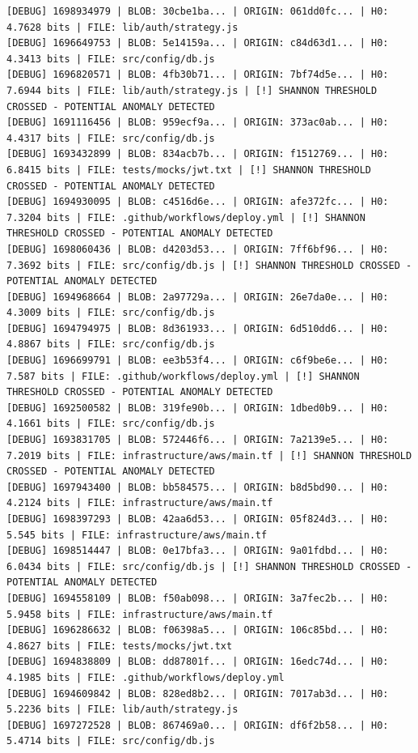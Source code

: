\documentclass[12pt, a4paper, oneside]{report}
\begin{document}
\newpage
\begin{lstlisting}[basicstyle=\tiny\ttfamily]
[DEBUG] 1698934979 | BLOB: 30cbe1ba... | ORIGIN: 061dd0fc... | H0: 4.7628 bits | FILE: lib/auth/strategy.js
[DEBUG] 1696649753 | BLOB: 5e14159a... | ORIGIN: c84d63d1... | H0: 4.3413 bits | FILE: src/config/db.js
[DEBUG] 1696820571 | BLOB: 4fb30b71... | ORIGIN: 7bf74d5e... | H0: 7.6944 bits | FILE: lib/auth/strategy.js | [!] SHANNON THRESHOLD CROSSED - POTENTIAL ANOMALY DETECTED
[DEBUG] 1691116456 | BLOB: 959ecf9a... | ORIGIN: 373ac0ab... | H0: 4.4317 bits | FILE: src/config/db.js
[DEBUG] 1693432899 | BLOB: 834acb7b... | ORIGIN: f1512769... | H0: 6.8415 bits | FILE: tests/mocks/jwt.txt | [!] SHANNON THRESHOLD CROSSED - POTENTIAL ANOMALY DETECTED
[DEBUG] 1694930095 | BLOB: c4516d6e... | ORIGIN: afe372fc... | H0: 7.3204 bits | FILE: .github/workflows/deploy.yml | [!] SHANNON THRESHOLD CROSSED - POTENTIAL ANOMALY DETECTED
[DEBUG] 1698060436 | BLOB: d4203d53... | ORIGIN: 7ff6bf96... | H0: 7.3692 bits | FILE: src/config/db.js | [!] SHANNON THRESHOLD CROSSED - POTENTIAL ANOMALY DETECTED
[DEBUG] 1694968664 | BLOB: 2a97729a... | ORIGIN: 26e7da0e... | H0: 4.3009 bits | FILE: src/config/db.js
[DEBUG] 1694794975 | BLOB: 8d361933... | ORIGIN: 6d510dd6... | H0: 4.8867 bits | FILE: src/config/db.js
[DEBUG] 1696699791 | BLOB: ee3b53f4... | ORIGIN: c6f9be6e... | H0: 7.587 bits | FILE: .github/workflows/deploy.yml | [!] SHANNON THRESHOLD CROSSED - POTENTIAL ANOMALY DETECTED
[DEBUG] 1692500582 | BLOB: 319fe90b... | ORIGIN: 1dbed0b9... | H0: 4.1661 bits | FILE: src/config/db.js
[DEBUG] 1693831705 | BLOB: 572446f6... | ORIGIN: 7a2139e5... | H0: 7.2019 bits | FILE: infrastructure/aws/main.tf | [!] SHANNON THRESHOLD CROSSED - POTENTIAL ANOMALY DETECTED
[DEBUG] 1697943400 | BLOB: bb584575... | ORIGIN: b8d5bd90... | H0: 4.2124 bits | FILE: infrastructure/aws/main.tf
[DEBUG] 1698397293 | BLOB: 42aa6d53... | ORIGIN: 05f824d3... | H0: 5.545 bits | FILE: infrastructure/aws/main.tf
[DEBUG] 1698514447 | BLOB: 0e17bfa3... | ORIGIN: 9a01fdbd... | H0: 6.0434 bits | FILE: src/config/db.js | [!] SHANNON THRESHOLD CROSSED - POTENTIAL ANOMALY DETECTED
[DEBUG] 1694558109 | BLOB: f50ab098... | ORIGIN: 3a7fec2b... | H0: 5.9458 bits | FILE: infrastructure/aws/main.tf
[DEBUG] 1696286632 | BLOB: f06398a5... | ORIGIN: 106c85bd... | H0: 4.8627 bits | FILE: tests/mocks/jwt.txt
[DEBUG] 1694838809 | BLOB: dd87801f... | ORIGIN: 16edc74d... | H0: 4.1985 bits | FILE: .github/workflows/deploy.yml
[DEBUG] 1694609842 | BLOB: 828ed8b2... | ORIGIN: 7017ab3d... | H0: 5.2236 bits | FILE: lib/auth/strategy.js
[DEBUG] 1697272528 | BLOB: 867469a0... | ORIGIN: df6f2b58... | H0: 5.4714 bits | FILE: src/config/db.js

\end{lstlisting}
\end{document}
